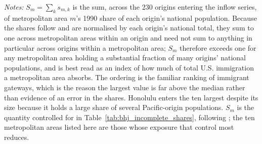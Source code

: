 \begin{table}[!htbp]
\centering
\caption{Metropolitan Areas with the Largest Sum of Exposure Shares}
\label{tab:sm_gateways}
\begin{minipage}{\textwidth}
\footnotesize
\vspace{4pt}
\textit{Notes:} $S_m = \sum_k s_{m,k}$ is the sum, across the 230 origins entering the inflow series, of metropolitan area $m$'s 1990 share of each origin's national population. Because the shares follow \citet{card2001immigrant} and are normalised by each origin's national total, they sum to one across metropolitan areas within an origin and need not sum to anything in particular across origins within a metropolitan area; $S_m$ therefore exceeds one for any metropolitan area holding a substantial fraction of many origins' national populations, and is best read as an index of how much of total U.S. immigration a metropolitan area absorbs. The ordering is the familiar ranking of immigrant gateways, which is the reason the largest value is far above the median rather than evidence of an error in the shares. Honolulu enters the ten largest despite its size because it holds a large share of several Pacific-origin populations. $S_m$ is the quantity controlled for in Table~\ref{tab:bhj_incomplete_shares}, following \citet{borusyak2022quasi}; the ten metropolitan areas listed here are those whose exposure that control most reduces.
\end{minipage}
\end{table}

